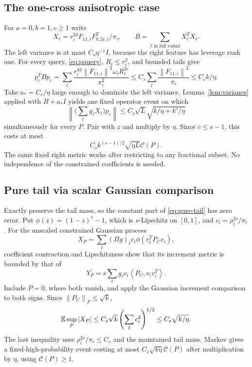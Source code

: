 \documentclass[11pt]{article}
\theoremstyle{remark}\newtheorem{remark}[theorem]{Remark}
\newcommand{\norm}[1]{\left\|#1\right\|}\newcommand{\ip}[2]{\left\langle #1,#2\right\rangle}
\newcommand{\cost}{\mathcal C}\newcommand{\OPT}{\mathsf{OPT}}
\begin{document}
\subsection{The one-cross anisotropic case}\label{sub:aniso}
For $a=0,b=1,c\ge1$ write
\[
 X_\ell=r_i^{2d}F_{11,i}F_{0,2c,i}^T/\pi_i,\qquad B=\sum_{\ell\text{ in full round}}X_\ell^TX_\ell.
\]
The left variance is at most $C_s\eta^{-1}I$, because the right feature has leverage rank one. For every query, \eqref{eq:pquery}, $R_i\le r_i^2$, and bounded tails give
\begin{equation}\label{eq:aniso-query}
 p_c^TBp_c
 =\sum_\ell\frac{r_i^{4d}\norm{F_{11,i}}^2\omega_iR_i^{2c}}{\pi_i^2}
 \le C_s\sum_\ell\frac{\norm{F_{11,i}}^2}{\pi_i}
 \le C_s k/\eta.
\end{equation}
Take $a_*=C_s/\eta$ large enough to dominate the left variance. Lemma~\ref{lem:variance} applied with $B+a_*I$ yields one fixed operator event on which
\[
 \norm{\bigl(\sum_\ell g_\ell X_\ell\bigr)p_c}
 \le C_s\sqrt{L}\sqrt{k/\eta+k^c/\eta}
\]
simultaneously for every $P$. Pair with $z$ and multiply by $\eta$. Since $c\le s-1$, this costs at most
\begin{equation}\label{eq:onecross-error}
 C_s k^{(s-1)/2}\sqrt{\eta L}\cost(P).
\end{equation}
The same fixed right metric works after restricting to any fractional subset. No independence of the constrained coefficients is needed.

\subsection{Pure tail via scalar Gaussian comparison}\label{sub:tail}
Exactly preserve the tail mass, so the constant part of \eqref{eq:pure-tail} has zero error. Put $\phi(z)=(1-z)^s-1$, which is $s$-Lipschitz on $[0,1]$, and $c_i=\rho_i^{2s}/\pi_i$. For the unscaled constrained Gaussian process
\[
 X_P=\sum_\ell(\Pi g)_\ell c_i\phi(v_i^TP_Cv_i),
\]
coefficient contraction and Lipschitzness show that its increment metric is bounded by that of
\[
 Y_P=s\sum_\ell g_\ell c_i\ip{P_C}{v_iv_i^T}.
\]
Include $P=0$, where both vanish, and apply the Gaussian increment comparison to both signs. Since $\norm{P_C}_F\le\sqrt{k}$,
\[
 \mathbb E\sup_P|X_P|\le C_s\sqrt{k}\left(\sum_\ell c_i^2\right)^{1/2}
 \le C_s\sqrt{k/\eta}.
\]
The last inequality uses $\rho_i^{2s}/\pi_i\le C_s$ and the maintained tail mass. Markov gives a fixed-high-probability event costing at most $C_s\sqrt{k\eta}\cost(P)$ after multiplication by $\eta$, using $\cost(P)\ge1$.
\end{document}
